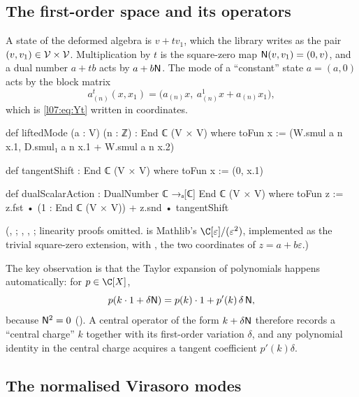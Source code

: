 \subsection{The first-order space and its operators}

A state of the deformed algebra is $v + tv_1$, which the library writes as the pair
$(v,v_1)\in\mathcal{V}\times\mathcal{V}$. Multiplication by $t$ is the square-zero map
$\mathsf{N}(v,v_1) = (0,v)$, and a dual number $a+tb$ acts by $a + b\mathsf{N}$. The mode of a ``constant''
state $a = (a,0)$ acts by the block matrix
\begin{equation}\label{l07:eq:lifted}
 a^t_{(n)}(x,x_1) = \big(a_{(n)}x,\ a^1_{(n)}x + a_{(n)}x_1\big),
\end{equation}
which is \eqref{l07:eq:Yt} written in coordinates.
\begin{leancode}
def liftedMode (a : V) (n : ℤ) : End ℂ (V × V) where
  toFun x := (W.smul a n x.1, D.smul₁ a n x.1 + W.smul a n x.2)

def tangentShift : End ℂ (V × V) where
  toFun x := (0, x.1)

def dualScalarAction : DualNumber ℂ →ₐ[ℂ] End ℂ (V × V) where
  toFun z := z.fst • (1 : End ℂ (V × V)) + z.snd • tangentShift
\end{leancode}
(, ;
, ,
; linearity proofs omitted.
 is Mathlib's $\C[\varepsilon]/(\varepsilon^2)$, implemented as the trivial square-zero
extension, with ,  the two coordinates of $z = a+b\varepsilon$.)

The key observation is that the Taylor expansion of polynomials happens automatically:
for $p\in\C[X]$,
\begin{equation}\label{l07:eq:taylor}
 p(k\cdot1 + \delta\mathsf{N}) = p(k)\cdot1 + p'(k)\,\delta\,\mathsf{N},
\end{equation}
because $\mathsf{N}^2 = 0$ (). A central operator of the form
$k+\delta\mathsf{N}$ therefore records a ``central charge'' $k$ together with its first-order variation
$\delta$, and any polynomial identity in the central charge acquires a tangent coefficient
$p'(k)\delta$.

\subsection{The normalised Virasoro modes}

